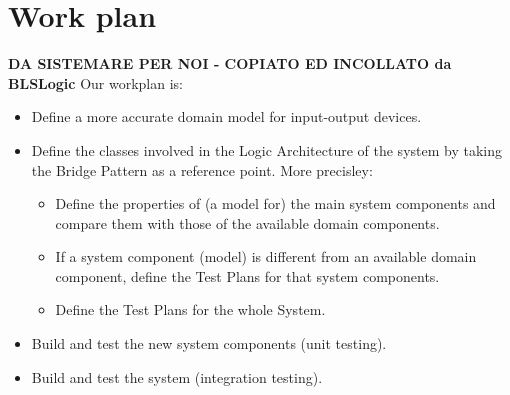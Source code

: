 \section{Work plan}
\textbf{DA SISTEMARE PER NOI - COPIATO ED INCOLLATO da BLSLogic}
Our workplan is:
\begin{itemize}
	\item Define a more accurate domain model for input-output devices.
	\item Define the classes involved in the Logic Architecture of the system by taking the Bridge Pattern as a reference point. More precisley:
	\begin{itemize}
		\item Define the properties of (a model for) the main system components and compare them with those of the available domain components.
		\item If a system component (model) is different from an available domain component, define the Test Plans for that system components.
		\item Define the Test Plans for the whole System.
	\end{itemize}
	\item Build and test the new system components (unit testing).
	\item Build and test the system (integration testing).
\end{itemize}